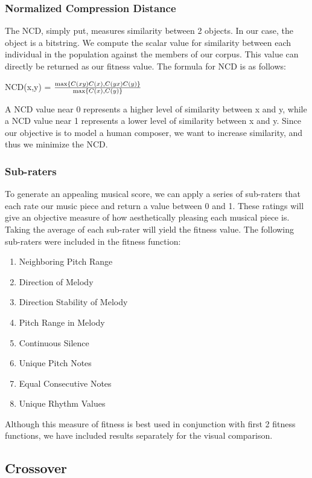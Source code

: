 \documentclass[conference]{IEEEtran}
\begin{document}
\subsubsection{Normalized Compression Distance}
The NCD, simply put, measures similarity between 2 objects. In our case, the object is a bitstring. We compute the scalar value for similarity between each individual in the population against the members of our corpus. This value can directly be returned as our fitness value. The formula for NCD is as follows:

\begin{center}
NCD(x,y) = ${\frac {\max\{C(xy)\-C(x),C(yx)\-C(y)\}}{\max\{C(x),C(y)\}}}$
\end{center}

A NCD value near 0 represents a higher level of similarity between x and y, while a NCD value near 1 represents a lower level of similarity between x and y. Since our objective is to model a human composer, we want to increase similarity, and thus we minimize the NCD.

\subsubsection{Sub-raters}
To generate an appealing musical score, we can apply a series of sub-raters that each rate our music piece and return a value between 0 and 1. These ratings will give an objective measure of how aesthetically pleasing each musical piece is. Taking the average of each sub-rater will yield the fitness value. The following sub-raters were included in the fitness function: \cite{b2}
\begin{enumerate}
    \item Neighboring Pitch Range
    \item Direction of Melody
    \item Direction Stability of Melody
    \item Pitch Range in Melody
    \item Continuous Silence
    \item Unique Pitch Notes
    \item Equal Consecutive Notes
    \item Unique Rhythm Values
\end{enumerate}
Although this measure of fitness is best used in conjunction with first 2 fitness functions, we have included results separately for the visual comparison.

\subsection{Crossover}
\end{document}
